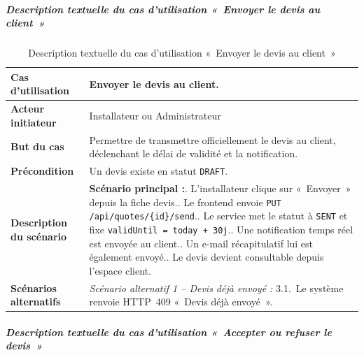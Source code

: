 \subparagraph{Description textuelle du cas d'utilisation «~Envoyer le devis au client~»}

\begin{table}[H]
  \caption{Description textuelle du cas d'utilisation «~Envoyer le devis au client~»}
  \label{tab:cu-envoyer-devis}
  \centering
  \begin{tabularx}{\textwidth}{|L{3.8cm}|X|}
    \hline
    \textbf{Cas d'utilisation} & Envoyer le devis au client. \\
    \hline
    \textbf{Acteur initiateur} & Installateur ou Administrateur \\
    \hline
    \textbf{But du cas} & Permettre de transmettre officiellement le devis au client, déclenchant le délai de validité et la notification. \\
    \hline
    \textbf{Précondition} & Un devis existe en statut \texttt{DRAFT}. \\
    \hline
    \textbf{Description du scénario} &
    \textbf{Scénario principal :}. L'installateur clique sur «~Envoyer~» depuis la fiche devis.. Le frontend envoie \texttt{PUT /api/quotes/\{id\}/send}.. Le service met le statut à \texttt{SENT} et fixe \texttt{validUntil = today + 30j}.. Une notification temps réel est envoyée au client.. Un e-mail récapitulatif lui est également envoyé.. Le devis devient consultable depuis l'espace client.\\
    \hline
    \textbf{Scénarios alternatifs} &
    \textit{Scénario alternatif 1 -- Devis déjà envoyé :}\newline
    \hspace*{6pt}3.1.~Le système renvoie HTTP~409 «~Devis déjà envoyé~».\\
    \hline
  \end{tabularx}
\end{table}

\subparagraph{Description textuelle du cas d'utilisation «~Accepter ou refuser le devis~»}

